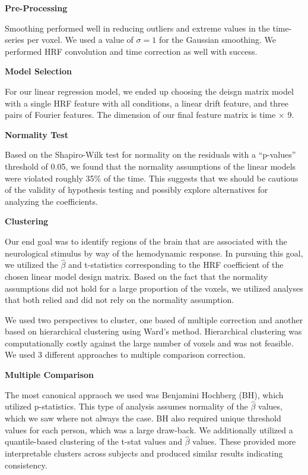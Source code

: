 

\noindent \textbf{Pre-Processing}

Smoothing performed well in reducing outliers and extreme values in the time-
series per voxel. We used a value of $\sigma=1$ for the Gaussian smoothing.  We
performed HRF convolution and time correction as well with success.
\vspace{5mm}

\noindent \textbf{Model Selection}

For our linear regression model, we ended up choosing the deisgn matrix model 
with a single HRF feature with all conditions, a linear drift feature, and 
three pairs of Fourier features. The dimension of our final feature matrix is 
time $\times$ 9. 
\vspace{5mm}

\noindent \textbf{Normality Test}

Based on the Shapiro-Wilk test for normality on the residuals with a 
``p-values'' threshold of 0.05, we found that the normality assumptions of the 
linear models were violated roughly 35\% of the time. This suggests that we 
should be cautious of the validity of hypothesis testing and possibly explore 
alternatives for analyzing the coefficients.
\vspace{5mm}

\noindent \textbf{Clustering}

Our end goal was to identify regions of the brain that are associated with the
neurological stimulus by way of the hemodynamic response. In pursuing this 
goal, we utilized the $\hat{\beta}$ and t-statistics corresponding to the HRF 
coefficient of the chosen linear model design matrix. Based on the fact that 
the normality assumptions did not hold for a large proportion of the voxels, 
we utilized analyses that both relied and did not rely on the normality 
assumption.

We used two perspectives to cluster, one based of multiple correction and 
another based on hierarchical clustering using Ward's method. Hierarchical 
clustering was computationally costly against the large number of voxels and 
was not feasible. We used 3 different approaches to multiple comparison 
correction. 
\vspace{5mm}

\noindent \textbf{Multiple Comparison}

The most canonical appraoch we used was Benjamini Hochberg (BH), which utilized
p-statistics. This type of analysis assumes normality of the $\hat{\beta}$ 
values, which we saw where not always the case. BH also required unique 
threshold values for each person, which was a large draw-back. We additionally 
utilized a quantile-based clustering of the t-stat values and $\hat{\beta}$ 
values. These provided more interpretable clusters across subjects and produced
similar results indicating consistency.
\vspace{5mm}

